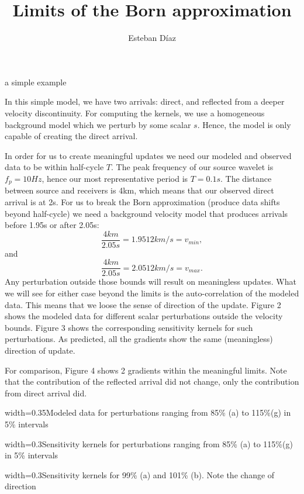 
\author{Esteban D\'{i}az}
\title{Limits of the Born approximation}{a simple example}


In this simple model, we have two arrivals: direct, and reflected from a deeper
velocity discontinuity. For computing the kernels, we use a homogeneous background model
which we perturb by some scalar $s$. Hence, the model is only capable of 
creating the direct arrival. 

In order for us to create meaningful updates we need our modeled and observed
data to be within half-cycle $T$. The peak frequency  of our source wavelet is $f_p=10Hz$, hence our most representative period is $T=0.1s$. The distance between 
source and receivers is 4km, which means that our observed direct arrival is at 2s. 
For us to break the Born approximation (produce data shifts beyond half-cycle) we need 
 a background velocity model that produces arrivals before 1.95s or after 2.05s:
\[
 \frac{4km}{2.05s} = 1.9512km/s = v_{min},
\] 
and
\[
 \frac{4km}{2.05s} = 2.0512km/s = v_{max}.
\] 
Any perturbation outside those bounds will result on meaningless updates. What we
will see for either case beyond the limits is the auto-correlation of the 
modeled data. This means that we loose the sense of direction of the update. 
 Figure 2 shows the modeled data for different scalar perturbations outside
the velocity bounds. Figure 3 shows the corresponding sensitivity kernels for
such perturbations. As predicted, all the gradients show the same (meaningless) direction of
update.

For comparison, Figure 4 shows 2 gradients within the meaningful limits. Note that
the contribution of the reflected arrival did not change, only the contribution from
direct arrival did. 





%
{width=0.35\textwidth}{Modeled data for perturbations ranging from 85\% (a) to
115\%(g) in 5\% intervals}




%
{width=0.3\textwidth}{Sensitivity kernels for perturbations ranging from 85\% (a) to
115\%(g) in 5\% intervals}


{width=0.3\textwidth}{Sensitivity kernels for 99\% (a) and 101\% (b). Note the change
of direction} 

